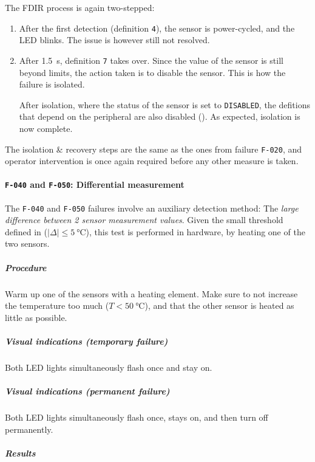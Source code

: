 \documentclass[a4paper,nobib]{tufte-book}
\begin{document}
The \acs{FDIR} process is again two-stepped:
\begin{enumerate}
	\item After the first detection (definition \texttt{4}), the sensor is power-cycled, and the \acs{LED} blinks. The issue is however still not resolved.
	\item After \SI{1.5}{\second}, definition \texttt{7} takes over. Since the value of the sensor is still beyond limits, the action taken is to disable the sensor. This is how the failure is isolated.
	
	After isolation, where the status of the sensor is set to \texttt{DISABLED}, the defitions that depend on the peripheral are also disabled (\invalid). As expected, isolation is now complete.
\end{enumerate}

The isolation \& recovery steps are the same as the ones from failure \texttt{F-020}, and operator intervention is once again required before any other measure is taken.


\clearpage
\paragraph{\textbf{\texttt{F-040} and \texttt{F-050}: Differential measurement}}\hspace{0pt}

The \texttt{F-040} and \texttt{F-050} failures involve an auxiliary detection method: The \emph{large difference between 2 sensor measurement values}. Given the small threshold defined in  (\(\lvert \Delta \rvert \leq \SI{5}{\celsius}\)), this test is performed in hardware, by heating one of the two sensors.

\subparagraph{Procedure}
\begin{compactenum}
	\item Warm up one of the sensors with a heating element. Make sure to not increase the temperature too much (\(T < \SI{50}{\celsius}\)), and that the other sensor is heated as little as possible.
\end{compactenum}

\subparagraph{Visual indications (temporary failure)} Both \acs{LED} lights simultaneously flash once and stay on.
\subparagraph{Visual indications (permanent failure)} Both \acs{LED} lights simultaneously flash once, stays on, and then turn off permanently.

\subparagraph{Results}\hspace{0pt}
\end{document}
